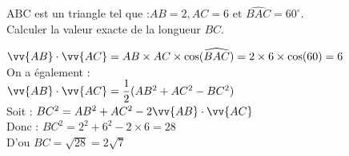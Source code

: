 \documentclass[11pt,a4paper]{article}  %
\begin{document}
	\graphicspath{{../images/}}
	
	\begin{center}
		
		
		\fbox{
			\begin{minipage}[]{15cm}
				\begin{center}
					\LARGE{\rule{0.5cm}{0pt}\rule[-0.25cm]{0pt}{0.9cm}
						\textcolor{red}{Correction - Exercices d'entrainement\\
						Application du produit scalaire}
					}
				\end{center}
			\end{minipage}
		}
	\end{center}

\exerciceDS{}
$\mathrm{ABC}$ est un triangle tel que :$A B=2, A C=6 \text { et } \widehat{B A C}=60^{\circ} .$\\
Calculer la valeur exacte de la longueur $B C$.

\begin{corrBox}
	$\vv{AB}\cdot\vv{AC}=AB\times AC\times\cos(\widehat{BAC})=2\times6\times\cos(60)=6$\\
	On a également :\\
	$\vv{AB}\cdot\vv{AC}=\dfrac{1}{2}(AB^2+AC^2-BC^2)$\\
	Soit : $BC^2=AB^2+AC^2-2\vv{AB}\cdot\vv{AC}$\\
	Donc : $BC^2=2^2+6^2-2\times6=28$\\
	D'ou $BC=\sqrt{28}=2\sqrt{7}$
\end{corrBox}
\end{document}
